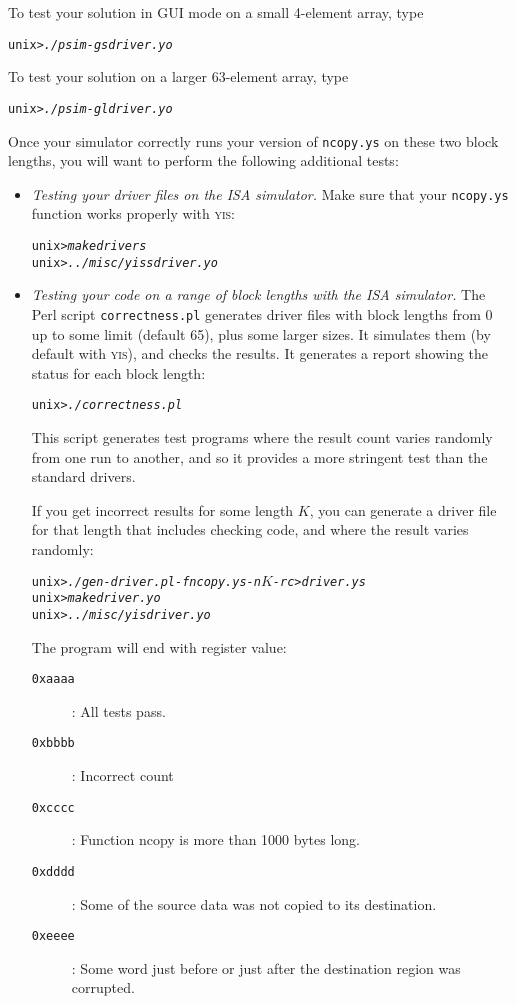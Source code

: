 \documentclass[11pt]{article}
\newenvironment{tty}%
{\small\begin{alltt}}%
{\end{alltt}}
\newenvironment{codefrag}%
{\small\begin{alltt}}%
{\end{alltt}%
}
\begin{document}
To test your solution in GUI mode on a small 4-element array, type
\begin{codefrag}
unix> {\em ./psim -g sdriver.yo}
\end{codefrag}
To test your solution on a larger 63-element array, type
\begin{codefrag}
unix> {\em ./psim -g ldriver.yo}
\end{codefrag}
Once your simulator correctly runs your version of \texttt{ncopy.ys} on 
these two block lengths,
you will want to perform the following additional tests:
\begin{itemize}
\item {\em Testing your driver files on the ISA simulator.} Make 
sure that your \texttt{ncopy.ys} function works properly with
\textsc{yis}:
\begin{codefrag}
unix> {\em make drivers}
unix> {\em ../misc/yis sdriver.yo}
\end{codefrag}

\item
{\em Testing your code on a range of block lengths with the ISA
simulator.}  The Perl script \texttt{correctness.pl} generates driver
files with block lengths from 0 up to some limit (default 65), plus
some larger sizes.  It
simulates them (by default with \textsc{yis}), and checks the results.  It
generates a report showing the status for each block length:
\begin{tty}
unix> {\em ./correctness.pl}
\end{tty}
This script generates test programs where the result count varies
randomly from one run to another, and so it provides a more stringent
test than the standard drivers.

If you get incorrect results for some length $K$, you can generate a
driver file for that length that includes checking code, and where the
result varies randomly:
\begin{tty}
unix> {\em ./gen-driver.pl -f ncopy.ys -n \(K\) -rc > driver.ys}
unix> {\em make driver.yo}
unix> {\em ../misc/yis driver.yo}
\end{tty}
The program will end with register \verb@%rax@ having the following
value:
\begin{description}
\item[\texttt{0xaaaa}]: All tests pass.
\item[\texttt{0xbbbb}]: Incorrect count
\item[\texttt{0xcccc}]: Function ncopy is more than 1000 bytes long.
\item[\texttt{0xdddd}]: Some of the source data was not copied to its
destination.
\item[\texttt{0xeeee}]: Some word just before or just after the
destination region was corrupted.
\end{description}


\end{itemize}
\end{document}
